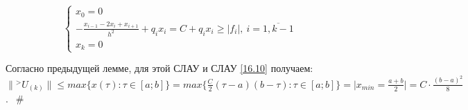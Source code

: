 \documentclass[__main__.tex]{subfiles}
\begin{document}
$$
\begin{cases}
x_0 = 0 \\
-\frac{x_{i-1} - 2 x_i + x_{i+1}}{h^2} + q_i x_i = C + q_i x_i \geq \left|f_i\right|, \ i = \overline{1,k-1} \\
x_k = 0
\end{cases}
$$

Согласно предыдущей лемме, для этой СЛАУ и СЛАУ \ref{16.10} получаем: $\| {}^> U_{\left(k\right)} \| \leq max \{ x \left(\tau\right): \tau \in [a;b]\} = max \{\frac{C}{2}\left(\tau - a\right) \left(b- \tau\right): \tau \in [a;b] \} = \big| x_{min} = \frac{a+b}{2} \big| = C \cdot \frac{\left(b-a\right)^2}{8}$. $\ \ \#$
\end{document}
